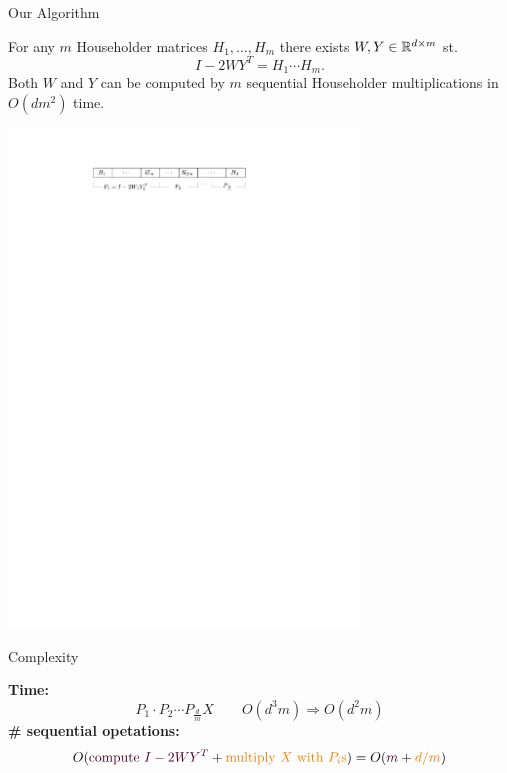 \begin{frame}{Our Algorithm}

	\begin{lemma}
		\cite{wydec} For any $m$ Householder matrices $H_1,...,H_m$ there exists $W,Y\in \mathbb{R}^{d\times m}$ st. 
		$$I-2WY^T = H_1 \cdots H_m. $$
		Both $W$ and $Y$ can be computed by $m$ sequential Householder multiplications in $O(dm^2)$ time. 
	\end{lemma}

	\begin{center}
		\includegraphics[width=0.7\textwidth, page=1]{graphics}
	\end{center}

\end{frame}

\begin{frame}{Complexity}

		\textbf{Time:} 
		$$P_1 \cdot P_2 \cdots P_{\frac{d}{m}} X \qquad O(d^3m) \Rightarrow O(d^2m) $$
		\textbf{\# sequential opetations:} 
		$$O({\color{darkred}\text{compute }I-2WY^T} + {\color{darkorange}\text{multiply }X\text{ with }P_i\text{s}}) = O({\color{darkred}m} + {\color{darkorange}d/m})$$

\end{frame}

